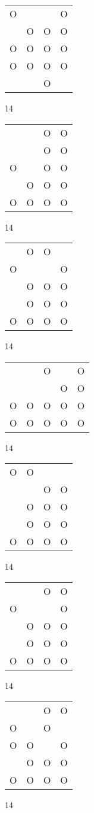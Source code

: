 \begin{tabular}{|m{0.2cm}m{0.2cm}m{0.2cm}m{0.2cm}|}\hline
O& & &O\\
 &O&O&O\\
O&O&O&O\\
O&O&O&O\\
 & &O& \\
\hline\end{tabular}14
\begin{tabular}{|m{0.2cm}m{0.2cm}m{0.2cm}m{0.2cm}|}\hline
 & &O&O\\
 & &O&O\\
O& &O&O\\
 &O&O&O\\
O&O&O&O\\
\hline\end{tabular}14
\begin{tabular}{|m{0.2cm}m{0.2cm}m{0.2cm}m{0.2cm}|}\hline
 &O&O& \\
O& & &O\\
 &O&O&O\\
 &O&O&O\\
O&O&O&O\\
\hline\end{tabular}14
\begin{tabular}{|m{0.2cm}m{0.2cm}m{0.2cm}m{0.2cm}m{0.2cm}|}\hline
 & &O& &O\\
 & & &O&O\\
O&O&O&O&O\\
O&O&O&O&O\\
\hline\end{tabular}14
\begin{tabular}{|m{0.2cm}m{0.2cm}m{0.2cm}m{0.2cm}|}\hline
O&O& & \\
 & &O&O\\
 &O&O&O\\
 &O&O&O\\
O&O&O&O\\
\hline\end{tabular}14
\begin{tabular}{|m{0.2cm}m{0.2cm}m{0.2cm}m{0.2cm}|}\hline
 & &O&O\\
O& & &O\\
 &O&O&O\\
 &O&O&O\\
O&O&O&O\\
\hline\end{tabular}14
\begin{tabular}{|m{0.2cm}m{0.2cm}m{0.2cm}m{0.2cm}|}\hline
 & &O&O\\
O& &O& \\
O&O& &O\\
 &O&O&O\\
O&O&O&O\\
\hline\end{tabular}14
